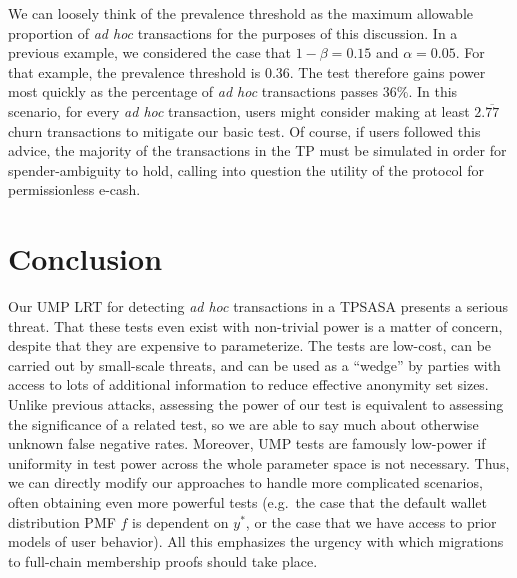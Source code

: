 \documentclass{tran-l}
\theoremstyle{cor}
\theoremstyle{definition}
\theoremstyle{remark}
\theoremstyle{conjecture}
\numberwithin{equation}{section}
\begin{document}
We can loosely think of the prevalence threshold as the maximum allowable proportion of \textit{ad hoc} transactions for the purposes of this discussion.
In a previous example, we considered the case that $1-\beta = 0.15$ and $\alpha = 0.05$. For that example, the prevalence threshold is $0.36$. The test therefore gains power most quickly as the percentage of \textit{ad hoc} transactions passes $36\%$.
In this scenario, for every \textit{ad hoc} transaction, users might consider making at least $2.\overline{77}$ churn transactions to mitigate our basic test.
Of course, if users followed this advice, the majority of the transactions in the TP must be simulated in order for spender-ambiguity to hold, calling into question the utility of the protocol for permissionless e-cash.

\section{Conclusion}\label{sec:conclusion_and_future}

Our UMP LRT for detecting \textit{ad hoc} transactions in a TPSASA presents a serious threat.
That these tests even exist with non-trivial power is a matter of concern, despite that they are expensive to parameterize.
The tests are low-cost, can be carried out by small-scale threats, and can be used as a ``wedge'' by parties with access to lots of additional information to reduce effective anonymity set sizes.
Unlike previous attacks, assessing the power of our test is equivalent to assessing the significance of a related test, so we are able to say much about otherwise unknown false negative rates.
Moreover, UMP tests are famously low-power if uniformity in test power across the whole parameter space is not necessary. Thus, we can directly modify our approaches to handle more complicated scenarios, often obtaining even more powerful tests (e.g.\ the case that the default wallet distribution PMF $f$ is dependent on $y^*$, or the case that we have access to prior models of user behavior).
All this emphasizes the urgency with which migrations to full-chain membership proofs should take place.
\end{document}
